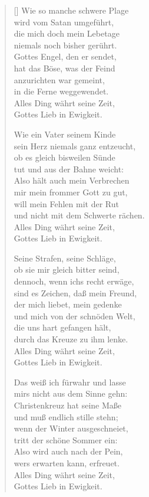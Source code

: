 \begin{multicols}{2}
\begin{verse}[\versewidth]
 Wie so manche schwere Plage\\
wird vom Satan umgeführt,\\
die mich doch mein Lebetage\\
niemals noch bisher gerührt.\\
Gottes Engel, den er sendet,\\
hat das Böse, was der Feind\\
anzurichten war gemeint,\\
in die Ferne weggewendet.\\
Alles Ding währt seine Zeit,\\
Gottes Lieb in Ewigkeit.

 Wie ein Vater seinem Kinde\\
sein Herz niemals ganz entzeucht,\\
ob es gleich bisweilen Sünde\\
tut und aus der Bahne weicht:\\
Also hält auch mein Verbrechen\\
mir mein frommer Gott zu gut,\\
will mein Fehlen mit der Rut\\
und nicht mit dem Schwerte rächen.\\
Alles Ding währt seine Zeit,\\
Gottes Lieb in Ewigkeit.

 Seine Strafen, seine Schläge,\\
ob sie mir gleich bitter seind,\\
dennoch, wenn ichs recht erwäge,\\
sind es Zeichen, daß mein Freund,\\
der mich liebet, mein gedenke\\
und mich von der schnöden Welt,\\
die uns hart gefangen hält,\\
durch das Kreuze zu ihm lenke.\\
Alles Ding währt seine Zeit,\\
Gottes Lieb in Ewigkeit.

\vfill\null
\columnbreak

 Das weiß ich fürwahr und lasse\\
mirs nicht aus dem Sinne gehn:\\
Christenkreuz hat seine Maße\\
und muß endlich stille stehn;\\
wenn der Winter ausgeschneiet,\\
tritt der schöne Sommer ein:\\
Also wird auch nach der Pein,\\
wers erwarten kann, erfreuet.\\
Alles Ding währt seine Zeit,\\
Gottes Lieb in Ewigkeit.


\end{verse}
\end{multicols}
